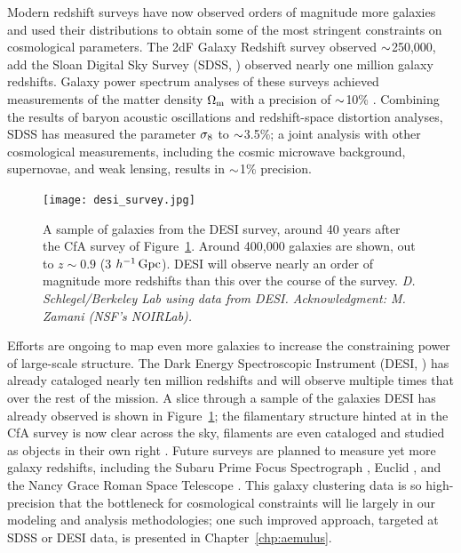 Modern redshift surveys have now observed orders of magnitude more galaxies and used their distributions to obtain some of the most stringent constraints on cosmological parameters.
The 2dF Galaxy Redshift survey \citep{Colless2001} observed $\mathord{\sim}$250,000, add the Sloan Digital Sky Survey (SDSS, \citealt{York2000}) observed nearly one million galaxy redshifts.
Galaxy power spectrum analyses of these surveys achieved measurements of the matter density ${\Omega_\mathrm{m}}$ with a precision of $\mathord{\sim}$10\% \citep{cole_2df_2005, tegmark_cosmological_2006}.
Combining the results of baryon acoustic oscillations and redshift-space distortion analyses, SDSS has measured the parameter $\sigma_\mathrm{8}$ to $\mathord{\sim}$3.5\%; a joint analysis with other cosmological measurements, including the cosmic microwave background, supernovae, and weak lensing, results in $\mathord{\sim}$1\% precision.

\begin{figure}
    \centering
    \texttt{[image: desi\_survey.jpg]}
    \caption{A sample of galaxies from the DESI survey, around 40 years after the CfA survey of Figure~\ref{fig:desi_survey}. Around 400,000 galaxies are shown, out to $z \sim 0.9$ (3 $h^{-1}\,\mathrm{Gpc}$). DESI will observe nearly an order of magnitude more redshifts than this over the course of the survey. \emph{D. Schlegel/Berkeley Lab using data from DESI. Acknowledgment: M. Zamani (NSF's NOIRLab).}}
    \label{fig:desi_survey}
\end{figure}

Efforts are ongoing to map even more galaxies to increase the constraining power of large-scale structure.
The Dark Energy Spectroscopic Instrument (DESI, \citealt{Aghamousa2016}) has already cataloged nearly ten million redshifts and will observe multiple times that over the rest of the mission.
A slice through a sample of the galaxies DESI has already observed is shown in Figure~\ref{fig:desi_survey}; the filamentary structure hinted at in the CfA survey is now clear across the sky, filaments are even cataloged and studied as objects in their own right \citep{tempel_detecting_2014}.
Future surveys are planned to measure yet more galaxy redshifts, including the Subaru Prime Focus Spectrograph \citep{takada_extragalactic_2014}, Euclid \citep{Laureijs2011}, and the Nancy Grace Roman Space Telescope \citep{Green2012}.
This galaxy clustering data is so high-precision that the bottleneck for cosmological constraints will lie largely in our modeling and analysis methodologies; one such improved approach, targeted at SDSS or DESI data, is presented in Chapter~\ref{chp:aemulus}.

